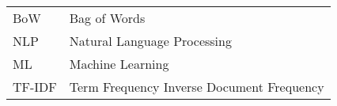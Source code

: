 \begin{longtable}{ll}

BoW & Bag of Words \\
NLP & Natural Language Processing \\
ML & Machine Learning \\
TF-IDF & Term Frequency Inverse Document Frequency \\

\end{longtable}

